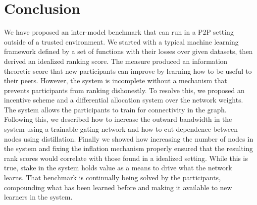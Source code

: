 \documentclass{article}
\begin{document}
\section{Conclusion}
\label{conclusion}
We have proposed an inter-model benchmark that can run in a P2P setting outside of a trusted environment. We started with a typical machine learning framework defined by a set of functions with their losses over given datasets, then derived an idealized ranking score. The measure produced an information theoretic score that new participants can improve by learning how to be useful to their peers. However, the system is incomplete without a mechanism that prevents participants from ranking dishonestly. To resolve this, we proposed an incentive scheme and a differential allocation system over the network weights. The system allows the participants to train for connectivity in the graph. Following this, we described how to increase the outward bandwidth in the system using a trainable gating network and how to cut dependence between nodes using distillation. Finally we showed how increasing the number of nodes in the system and fixing the inflation mechanism properly ensured that the resulting rank scores would correlate with those found in a idealized setting. While this is true, stake in the system holds value as a means to drive what the network learns. That benchmark is continually being solved by the participants, compounding what has been learned before and making it available to new learners in the system.

\end{document}
